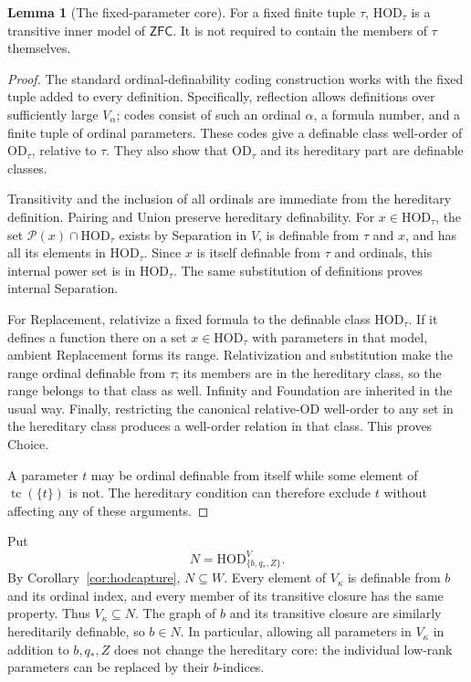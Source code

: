 \documentclass[11pt,letterpaper]{article}
\theoremstyle{definition}
\newtheorem{lemma}[definition]{Lemma}
\numberwithin{equation}{section}
\newcommand{\ZFC}{\mathsf{ZFC}}
\newcommand{\OD}{\mathrm{OD}}
\newcommand{\HOD}{\mathrm{HOD}}
\newcommand{\Pow}{\mathcal P}
\begin{document}
\begin{lemma}[The fixed-parameter core]\label{lem:hod}
For a fixed finite tuple $\tau$, $\HOD_\tau$ is a transitive inner model of $\ZFC$. It is not required to contain the members of $\tau$ themselves.
\end{lemma}
\begin{proof}
The standard ordinal-definability coding construction works with the fixed tuple added to every definition. Specifically, reflection allows definitions over sufficiently large $V_\alpha$; codes consist of such an ordinal $\alpha$, a formula number, and a finite tuple of ordinal parameters. These codes give a definable class well-order of $\OD_\tau$, relative to $\tau$. They also show that $\OD_\tau$ and its hereditary part are definable classes.

Transitivity and the inclusion of all ordinals are immediate from the hereditary definition. Pairing and Union preserve hereditary definability. For $x\in\HOD_\tau$, the set $\Pow(x)\cap\HOD_\tau$ exists by Separation in $V$, is definable from $\tau$ and $x$, and has all its elements in $\HOD_\tau$. Since $x$ is itself definable from $\tau$ and ordinals, this internal power set is in $\HOD_\tau$. The same substitution of definitions proves internal Separation.

For Replacement, relativize a fixed formula to the definable class $\HOD_\tau$. If it defines a function there on a set $x\in\HOD_\tau$ with parameters in that model, ambient Replacement forms its range. Relativization and substitution make the range ordinal definable from $\tau$; its members are in the hereditary class, so the range belongs to that class as well. Infinity and Foundation are inherited in the usual way. Finally, restricting the canonical relative-OD well-order to any set in the hereditary class produces a well-order relation in that class. This proves Choice.

A parameter $t$ may be ordinal definable from itself while some element of $\operatorname{tc}(\{t\})$ is not. The hereditary condition can therefore exclude $t$ without affecting any of these arguments.
\end{proof}

Put
\[
 N=\HOD_{\{b,q_*,Z\}}^V.
\]
By Corollary~\ref{cor:hodcapture}, $N\subseteq W$. Every element of $V_\kappa$ is definable from $b$ and its ordinal index, and every member of its transitive closure has the same property. Thus $V_\kappa\subseteq N$. The graph of $b$ and its transitive closure are similarly hereditarily definable, so $b\in N$. In particular, allowing all parameters in $V_\kappa$ in addition to $b,q_*,Z$ does not change the hereditary core: the individual low-rank parameters can be replaced by their $b$-indices.
\end{document}
